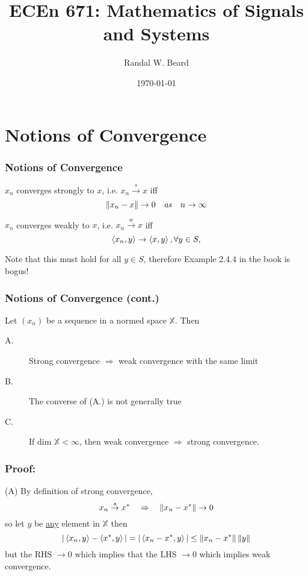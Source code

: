 \documentclass{beamer}
\title{ECEn 671: Mathematics of Signals and Systems}
\author{Randal W. Beard}
\institute{Brigham Young University}
\date{\today}
\begin{document}
\begin{frame}
	\titlepage
\end{frame}



\section{Notions of Convergence}
\frame{\sectionpage}

\begin{frame}\frametitle{Notions of Convergence}

\begin{definition}
$x_n$ converges strongly to $x$, i.e. $x_n \overset{s}{\to} x$ iff
\[
\left\| x_n-x\right\|  \to 0 \quad \mathit{ as } \quad n \to \infty 
\]	
\end{definition}

\begin{definition}
$x_n$ converges weakly to $x$, i.e. $x_n \overset{w}{\to} x$ iff
\[ 
\left< x_n, y \right> \to \left< x,y \right>, \forall y \in S, 
\]	
\end{definition}

Note that this must hold for all $y \in S$, therefore Example 2.4.4 in the book is bogus!

\end{frame}

\begin{frame}\frametitle{Notions of Convergence (cont.)}
\begin{theorem}
  Let $(x_n)$ be a sequence in a normed space $\mathbb{X}$.  Then
\begin{description}
  \item[A.] Strong convergence $\Rightarrow$ weak convergence with the same limit
  \item[B.] The converse of (A.) is not generally true
  \item[C.] If dim $\mathbb{X} < \infty$, then weak convergence $\Rightarrow$ strong convergence.
\end{description}
\end{theorem}
	
\end{frame}

\begin{frame}\frametitle{Proof:}
\noindent (A) By definition of strong convergence,
\[ 
x_n \overset{s}{\to} x^* \quad \Rightarrow \quad \left\| x_n-x^*\right\|  \to 0
\]
so let $y$ be \underline{any} element in $\mathbb{X}$ then
\[ 
|\left< x_n,y \right> - \left< x^*,y \right> | = |\left< x_n - x^*,y \right> | \leq \left\| x_n-x^*\right\|  \left\| y\right\|  
\]
but the RHS $\to 0$ which implies that the LHS $\to 0$ which implies weak convergence.
\end{frame}
\end{document}
